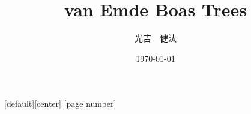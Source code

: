 \usepackage{bxdpx-beamer}
\usepackage{pxjahyper}
\usepackage{minijs}%
\usepackage{latexsym}
\usepackage{tikz}
\usetikzlibrary{calc,quotes,positioning}
\renewcommand{\kanjifamilydefault}{\gtdefault}%

[default][center]
[page number]

\usepackage{amsmath,amssymb}
\usepackage{amsthm}
\theoremstyle{definition}
\newtheorem{theorem}{定理}
\newtheorem{definition}{定義}
\newtheorem{proposition}{命題}
\newtheorem{lemma}{補題}
\newtheorem{corollary}{系}
\newtheorem{conjecture}{予想}
\newtheorem*{remark}{Remark}
\renewcommand{\proofname}{}

\usepackage[T1]{fontenc}%
\usepackage{textcomp}%
\usepackage[utf8]{inputenc}%
\usepackage{otf}%
\usepackage{txfonts}%
\usepackage{bm}%

\newcommand{\func}[1]{\ensuremath\mathrm{#1}}
 
\title[略タイトル]{van Emde Boas Trees}
\author[Mitsuyoshi]{光吉　健汰}
\date{\today}%

